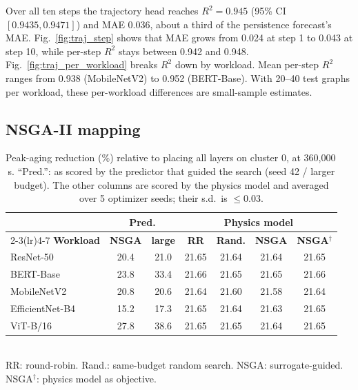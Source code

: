 \documentclass[conference]{IEEEtran}
\begin{document}
Over all ten steps the trajectory head reaches $R^2 = 0.945$ (95\% CI $[0.9435, 0.9471]$) and MAE $0.036$, about a third of the persistence forecast's MAE. Fig.~\ref{fig:traj_step} shows that MAE grows from 0.024 at step 1 to 0.043 at step 10, while per-step $R^2$ stays between 0.942 and 0.948. Fig.~\ref{fig:traj_per_workload} breaks $R^2$ down by workload. Mean per-step $R^2$ ranges from 0.938 (MobileNetV2) to 0.952 (BERT-Base). With 20--40 test graphs per workload, these per-workload differences are small-sample estimates.

\subsection{NSGA-II mapping}
\label{sec:nsga_results}

\begin{table}[t]
    \centering
    \caption{Peak-aging reduction (\%) relative to placing all layers on cluster 0, at 360{,}000\,s. ``Pred.'': as scored by the predictor that guided the search (seed 42 / larger budget). The other columns are scored by the physics model and averaged over 5 optimizer seeds; their s.d.\ is $\le 0.03$.}
    \label{tab:nsga}
    \small
    \setlength{\tabcolsep}{3pt}
    \begin{tabular}{lcccccc}
        \toprule
        & \multicolumn{2}{c}{\textbf{Pred.}} & \multicolumn{4}{c}{\textbf{Physics model}} \\
        \cmidrule(lr){2-3}\cmidrule(lr){4-7}
        \textbf{Workload} & \textbf{NSGA} & \textbf{large} & \textbf{RR} & \textbf{Rand.} & \textbf{NSGA} & \textbf{NSGA$^\dagger$} \\
        \midrule
        ResNet-50       & 20.4 & 21.0 & 21.65 & 21.64 & 21.64 & 21.65 \\
        BERT-Base       & 23.8 & 33.4 & 21.66 & 21.65 & 21.65 & 21.66 \\
        MobileNetV2     & 20.8 & 20.6 & 21.64 & 21.60 & 21.58 & 21.64 \\
        EfficientNet-B4 & 15.2 & 17.3 & 21.65 & 21.64 & 21.63 & 21.65 \\
        ViT-B/16        & 27.8 & 38.6 & 21.65 & 21.65 & 21.64 & 21.65 \\
        \bottomrule
    \end{tabular}
    \\[2pt]{\footnotesize RR: round-robin. Rand.: same-budget random search. NSGA: surrogate-guided. NSGA$^\dagger$: physics model as objective.}
\end{table}
\end{document}
